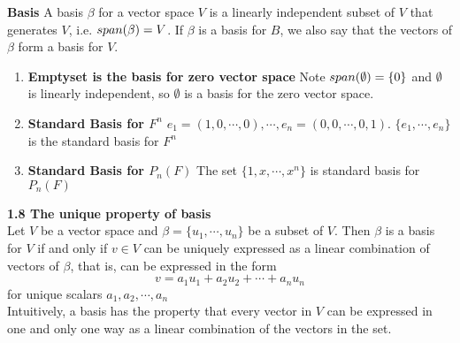 \documentclass[11pt]{article}
\begin{document}
\begin{defn*}
    \textbf{Basis} A basis $\beta$ for a vector space $V$ is a linearly independent subset of $V$ that generates $V$, i.e. $span(\beta) = V$. If $\beta$ is a basis for $B$, we also say that the vectors of $\beta$ form a basis for $V$. 
    \begin{enumerate}
        \item \textbf{Emptyset is the basis for zero vector space} Note $span(\emptyset)=\{0\}$ and $\emptyset$ is linearly independent, so $\emptyset$ is a basis for the zero vector space. 
        \item \textbf{Standard Basis for $F^n$} $e_1 = (1,0,\cdots, 0), \cdots, e_n= (0,0,\cdots, 0,1)$. $\{e_1, \cdots, e_n\}$ is the standard basis for $F^n$
        \item \textbf{Standard Basis for $P_n(F)$} The set $\{1,x,\cdots, x^n\}$ is standard basis for $P_n(F)$
    \end{enumerate}
\end{defn*}

\begin{theorem*}
    \textbf{1.8 The unique property of basis} \\  
    Let $V$ be a vector space and $\beta = \{u_1, \cdots, u_n \}$ be a subset of $V$. Then $\beta$ is a basis for $V$ if and only if $v\in V$ can be uniquely expressed as a linear combination of vectors of $\beta$, that is, can be expressed in the form 
    \[
        v = a_1 u_1 + a_2 u_2 + \cdots + a_n u_n    
    \]
    for unique scalars $a_1, a_2, \cdots, a_n$ \\
    Intuitively, a basis has the property that every vector in $V$ can be expressed in one and only one way as a linear combination of the vectors in the set. 
\end{theorem*}
\end{document}
